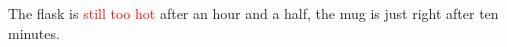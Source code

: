 The flask is \textcolor{red}{still too hot} after an hour and a half,
the mug is {\color{ostblue}just right} after ten minutes.
